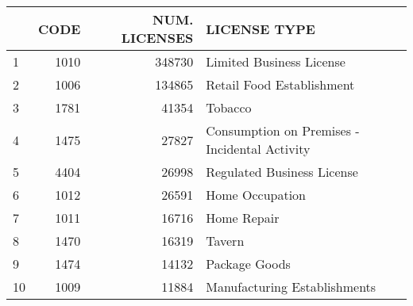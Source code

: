 \documentclass[preview]{standalone}
\begin{document}
            \begin{tabular}{lrrl}
\toprule
{} &  CODE &  NUM. LICENSES &                                   LICENSE TYPE \\
\midrule
1  &  1010 &         348730 &                       Limited Business License \\
2  &  1006 &         134865 &                      Retail Food Establishment \\
3  &  1781 &          41354 &                                        Tobacco \\
4  &  1475 &          27827 &  Consumption on Premises - Incidental Activity \\
5  &  4404 &          26998 &                     Regulated Business License \\
6  &  1012 &          26591 &                                Home Occupation \\
7  &  1011 &          16716 &                                    Home Repair \\
8  &  1470 &          16319 &                                         Tavern \\
9  &  1474 &          14132 &                                  Package Goods \\
10 &  1009 &          11884 &                   Manufacturing Establishments \\
\bottomrule
\end{tabular}

            
\end{document}
